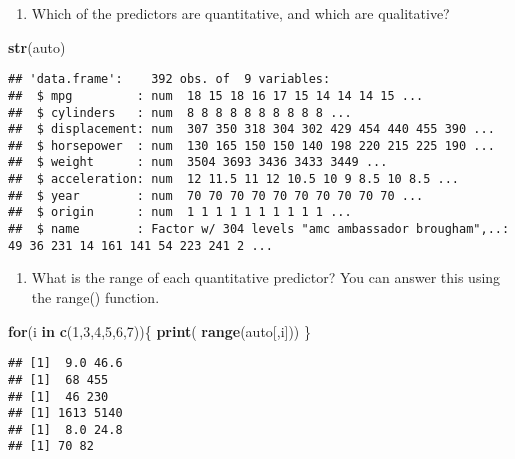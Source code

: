 \documentclass[
]{article}
\newenvironment{Shaded}{\begin{snugshade}}{\end{snugshade}}
\newcommand{\ControlFlowTok}[1]{\textcolor[rgb]{0.13,0.29,0.53}{\textbf{#1}}}
\newcommand{\DecValTok}[1]{\textcolor[rgb]{0.00,0.00,0.81}{#1}}
\newcommand{\FunctionTok}[1]{\textcolor[rgb]{0.13,0.29,0.53}{\textbf{#1}}}
\newcommand{\NormalTok}[1]{#1}
\providecommand{\tightlist}{%
  \setlength{\itemsep}{0pt}\setlength{\parskip}{0pt}}
\begin{document}
\begin{enumerate}
\def\labelenumi{(\alph{enumi})}
\tightlist
\item
  Which of the predictors are quantitative, and which are qualitative?
\end{enumerate}

\begin{Shaded}
\begin{Highlighting}[]
\FunctionTok{str}\NormalTok{(auto)}
\end{Highlighting}
\end{Shaded}

\begin{verbatim}
## 'data.frame':    392 obs. of  9 variables:
##  $ mpg         : num  18 15 18 16 17 15 14 14 14 15 ...
##  $ cylinders   : num  8 8 8 8 8 8 8 8 8 8 ...
##  $ displacement: num  307 350 318 304 302 429 454 440 455 390 ...
##  $ horsepower  : num  130 165 150 150 140 198 220 215 225 190 ...
##  $ weight      : num  3504 3693 3436 3433 3449 ...
##  $ acceleration: num  12 11.5 11 12 10.5 10 9 8.5 10 8.5 ...
##  $ year        : num  70 70 70 70 70 70 70 70 70 70 ...
##  $ origin      : num  1 1 1 1 1 1 1 1 1 1 ...
##  $ name        : Factor w/ 304 levels "amc ambassador brougham",..: 49 36 231 14 161 141 54 223 241 2 ...
\end{verbatim}

\begin{enumerate}
\def\labelenumi{(\alph{enumi})}
\setcounter{enumi}{1}
\tightlist
\item
  What is the range of each quantitative predictor? You can answer this
  using the range() function.
\end{enumerate}

\begin{Shaded}
\begin{Highlighting}[]
\ControlFlowTok{for}\NormalTok{(i }\ControlFlowTok{in} \FunctionTok{c}\NormalTok{(}\DecValTok{1}\NormalTok{,}\DecValTok{3}\NormalTok{,}\DecValTok{4}\NormalTok{,}\DecValTok{5}\NormalTok{,}\DecValTok{6}\NormalTok{,}\DecValTok{7}\NormalTok{))\{}
 \FunctionTok{print}\NormalTok{( }\FunctionTok{range}\NormalTok{(auto[,i]))}
\NormalTok{\}}
\end{Highlighting}
\end{Shaded}

\begin{verbatim}
## [1]  9.0 46.6
## [1]  68 455
## [1]  46 230
## [1] 1613 5140
## [1]  8.0 24.8
## [1] 70 82
\end{verbatim}
\end{document}
